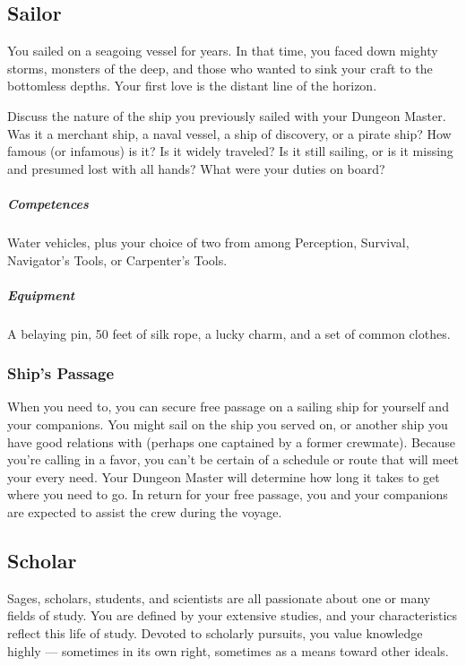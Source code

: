 \subsection*{Sailor} \label{ssec::sailor}
    You sailed on a seagoing vessel for years.
    In that time, you faced down mighty storms, monsters of the deep, and those who wanted to sink your craft to the bottomless depths.
    Your first love is the distant line of the horizon.

    Discuss the nature of the ship you previously sailed with your Dungeon Master.
    Was it a merchant ship, a naval vessel, a ship of discovery, or a pirate ship?
    How famous (or infamous) is it?
    Is it widely traveled?
    Is it still sailing, or is it missing and presumed lost with all hands?
    What were your duties on board?

    \subparagraph{Competences} Water vehicles, plus your choice of two from among Perception, Survival, Navigator's Tools, or Carpenter's Tools.

    \subparagraph{Equipment} A belaying pin, 50 feet of silk rope, a lucky charm, and a set of common clothes.

    \subsubsection{Ship's Passage}
        When you need to, you can secure free passage on a sailing ship for yourself and your companions.
        You might sail on the ship you served on, or another ship you have good relations with (perhaps one captained by a former crewmate).
        Because you're calling in a favor, you can't be certain of a schedule or route that will meet your every need.
        Your Dungeon Master will determine how long it takes to get where you need to go.
        In return for your free passage, you and your companions are expected to assist the crew during the voyage.

\subsection*{Scholar} \label{ssec::scholar}
    Sages, scholars, students, and scientists are all passionate about one or many fields of study.
    You are defined by your extensive studies, and your characteristics reflect this life of study.
    Devoted to scholarly pursuits, you value knowledge highly --- sometimes in its own right, sometimes as a means toward other ideals.

